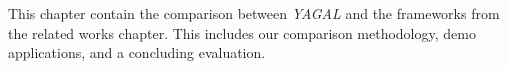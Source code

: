 This chapter contain the comparison between \textit{YAGAL} and the frameworks from the related works chapter. This includes our comparison methodology, demo applications, and a concluding evaluation.
 